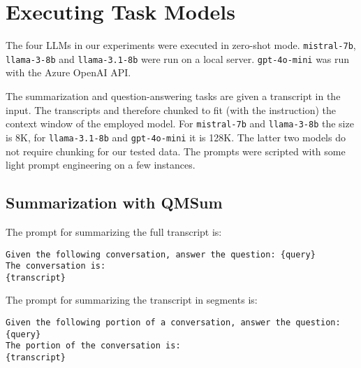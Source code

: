 


\section{Executing Task Models}
\label{sec_appendix_prompts}

The four LLMs in our experiments were executed in zero-shot mode. \texttt{mistral-7b}, \texttt{llama-3-8b} and \texttt{llama-3.1-8b} were run on a local server. \texttt{gpt-4o-mini} was run with the Azure OpenAI API.

The summarization and question-answering tasks are given a transcript in the input. The transcripts and therefore chunked to fit (with the instruction) the context window of the employed model. For \texttt{mistral-7b} and \texttt{llama-3-8b} the size is 8K, for \texttt{llama-3.1-8b} and \texttt{gpt-4o-mini} it is 128K. The latter two models do not require chunking for our tested data. The prompts were scripted with some light prompt engineering on a few instances.

\subsection{Summarization with QMSum}
\label{sec_appendix_prompts_qmsum}

The prompt for summarizing the full transcript is:

\begin{tcolorbox}[colback=gray!10, colframe=gray!50, sharp corners, boxrule=0.5mm]
\texttt{Given the following conversation, answer the question: \{query\}\\
The conversation is:\\
\{transcript\}}
\end{tcolorbox}

\noindent
The prompt for summarizing the transcript in segments is:

\begin{tcolorbox}[colback=gray!10, colframe=gray!50, sharp corners, boxrule=0.5mm]
\texttt{Given the following portion of a conversation, answer the question: \{query\}\\
The portion of the conversation is:\\
\{transcript\}}
\end{tcolorbox}

